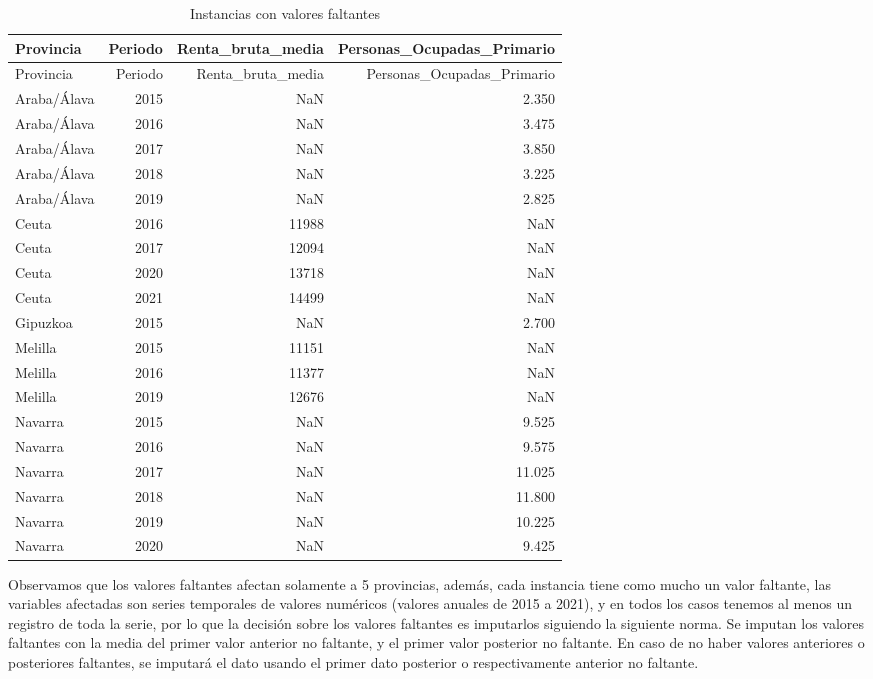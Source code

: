 \documentclass[data,article,submit,moreauthors,pdftex]{Definitions/mdpi}
\begin{document}
\begin{longtable}[]{@{}lrrr@{}}
\caption{Instancias con valores faltantes}\tabularnewline
\toprule\noalign{}
Provincia & Periodo & Renta\_bruta\_media &
Personas\_Ocupadas\_Primario \\
\midrule\noalign{}
\endfirsthead
\toprule\noalign{}
Provincia & Periodo & Renta\_bruta\_media &
Personas\_Ocupadas\_Primario \\
\midrule\noalign{}
\endhead
\bottomrule\noalign{}
\endlastfoot
Araba/Álava & 2015 & NaN & 2.350 \\
Araba/Álava & 2016 & NaN & 3.475 \\
Araba/Álava & 2017 & NaN & 3.850 \\
Araba/Álava & 2018 & NaN & 3.225 \\
Araba/Álava & 2019 & NaN & 2.825 \\
Ceuta & 2016 & 11988 & NaN \\
Ceuta & 2017 & 12094 & NaN \\
Ceuta & 2020 & 13718 & NaN \\
Ceuta & 2021 & 14499 & NaN \\
Gipuzkoa & 2015 & NaN & 2.700 \\
Melilla & 2015 & 11151 & NaN \\
Melilla & 2016 & 11377 & NaN \\
Melilla & 2019 & 12676 & NaN \\
Navarra & 2015 & NaN & 9.525 \\
Navarra & 2016 & NaN & 9.575 \\
Navarra & 2017 & NaN & 11.025 \\
Navarra & 2018 & NaN & 11.800 \\
Navarra & 2019 & NaN & 10.225 \\
Navarra & 2020 & NaN & 9.425 \\
\end{longtable}

Observamos que los valores faltantes afectan solamente a 5 provincias,
además, cada instancia tiene como mucho un valor faltante, las variables
afectadas son series temporales de valores numéricos (valores anuales de
2015 a 2021), y en todos los casos tenemos al menos un registro de toda
la serie, por lo que la decisión sobre los valores faltantes es
imputarlos siguiendo la siguiente norma. Se imputan los valores
faltantes con la media del primer valor anterior no faltante, y el
primer valor posterior no faltante. En caso de no haber valores
anteriores o posteriores faltantes, se imputará el dato usando el primer
dato posterior o respectivamente anterior no faltante.
\end{document}
